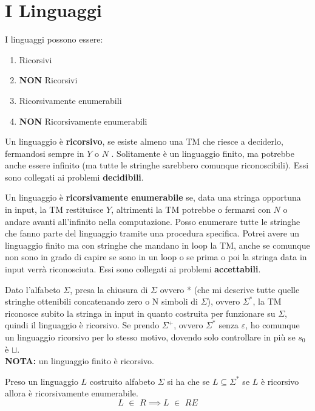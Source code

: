 \section{I Linguaggi}
I linguaggi possono essere:
\begin{enumerate}
    \item Ricorsivi
    \item \textbf{NON} Ricorsivi
    \item Ricorsivamente enumerabili
    \item \textbf{NON} Ricorsivamente enumerabili
\end{enumerate} 
\begin{definizione}
  Un linguaggio è \textbf{ricorsivo}, se esiste
  almeno una TM che riesce a deciderlo, fermandosi sempre in $Y$ o
  $N$ . Solitamente è un linguaggio finito, ma potrebbe anche essere infinito (ma
  tutte le stringhe sarebbero comunque riconoscibili). Essi sono collegati ai problemi \textbf{decidibili}.
\end{definizione}
 \begin{definizione}
   Un linguaggio è \textbf{ricorsivamente enumerabile} se, data una stringa opportuna in
  input, la TM restituisce $Y$, altrimenti la TM potrebbe o fermarsi con $N$ o andare
  avanti all'infinito nella computazione. Posso enumerare tutte le stringhe che
  fanno parte del linguaggio tramite una procedura specifica. Potrei avere
  un linguaggio finito ma con 
  stringhe che mandano in loop la TM, anche se comunque non sono in grado di
  capire se sono in un loop o se prima o poi la stringa data in input verrà
  riconosciuta. Essi sono collegati ai problemi \textbf{accettabili}.
 \end{definizione}
Dato l'alfabeto $\Sigma$, presa la chiusura
di $\Sigma$ ovvero * (che mi descrive tutte quelle stringhe ottenibili concatenando zero o N simboli di $\Sigma$), ovvero $\Sigma^*$,
la TM riconosce subito la stringa in input in quanto costruita per funzionare
su $\Sigma$, quindi il linguaggio è ricorsivo. Se prendo $\Sigma^+$, ovvero
$\Sigma^*$ senza $\varepsilon$, ho comunque un linguaggio ricorsivo per lo
stesso motivo, dovendo solo controllare in più se $s_0$ è $\sqcup$.\\
 \textbf{NOTA:} un linguaggio finito è ricorsivo.\\
\begin{definizione}
  Preso un linguaggio $L$ costruito alfabeto $\Sigma$ si ha che
  se $L\subseteq\Sigma^*$ se $L$ è ricorsivo allora è ricorsivamente
  enumerabile.
\[L\,\,\in\,\,R \implies L\,\,\in\,\,RE\]
\end{definizione}
